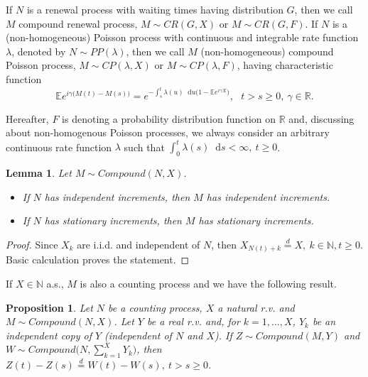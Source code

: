 \documentclass[12pt, twoside, english, headsepline]{article}
\newcommand*\dif{\mathop{}\!\mathrm{d}}  %
\newtheorem{proposition}{Proposition}[section] %
\newtheorem{lemma}[theorem]{Lemma}
\theoremstyle{definition} %
\numberwithin{equation}{section} %
\begin{document}
If $N$ is a renewal process with waiting times having distribution $G$, then we call $M$ compound renewal process, $M\sim CR(G, X)$ or $M\sim CR(G,F)$. 
If $N$ is a (non-homogeneous) Poisson process with continuous and integrable rate function $\lambda$, denoted by $N\sim PP(\lambda)$, then we call $M$ (non-homogeneous) compound Poisson process, $M\sim CP(\lambda, X)$ or $M\sim CP(\lambda, F)$, having characteristic function
\begin{equation}\label{trasformataFourierProcessoCompound}
	\mathbb{E}e^{i\gamma \big( M(t)-M(s)\big)} = e^{-\int_s^t \lambda(u)\dif u\big(1- \mathbb{E}e^{i\gamma X}\big) }, \ \ \ t> s \ge0,\ \gamma \in \mathbb{R}.
\end{equation}

Hereafter, $F$ is denoting a probability distribution function on $\mathbb{R}$ and, discussing about non-homogenous Poisson processes, we always consider an arbitrary continuous rate function $\lambda$ such that $\int_0^t\lambda(s)\dif s <\infty, \ t\ge0$.


\begin{lemma}\label{lemmaCompostoIncrementiIndipendenti}
	Let $M\sim Compound(N,X)$.
	\begin{itemize}
		\item[($i$)] If $N$ has independent increments, then $M$ has independent increments.
		\item[($ii$)] If $N$ has stationary increments, then $M$ has stationary increments.
	\end{itemize} 
\end{lemma}

\begin{proof}
	Since $X_k$ are i.i.d. and independent of $N$, then $X_{N(t)+k} \stackrel{d}{=} X,\  k\in\mathbb{N},t\ge0$. Basic calculation proves the statement.
\end{proof}

If $X\in\mathbb{N}$ a.s., $M$ is also a counting process and we have the following result.
\begin{proposition}\label{proposizioneCompostoDiCompostoProcessoConteggio}
	Let $N$ be a counting process, $X$ a natural r.v. and $M\sim Compound(N,X)$. 
	 Let $Y$ be a real r.v. and, for $ k=1,\dots,X$, $Y_k$ be an  independent copy of $Y$ (independent of $N$ and $X$). If $Z\sim Compound(M, Y)$ and $W\sim Compound\big(N, \sum_{k=1}^X Y_k\big)$, then $Z(t)-Z(s) \stackrel{d}{=}W(t)-W(s),\ t>s\ge0$.
\end{proposition}
\end{document}
